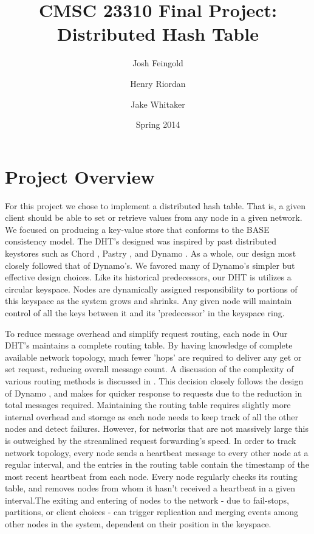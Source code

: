 \documentclass[11pt]{article}
\title{CMSC 23310 Final Project:\\
Distributed Hash Table}
\author{Josh Feingold \and Henry Riordan \and Jake Whitaker}
\date{Spring 2014}
\begin{document}
\maketitle

\section{Project Overview}\label{sec:overview}

For this project we chose to implement a distributed hash table. That is, a given client should be able to set or retrieve values from any node in a given network. We focused on producing a key-value store that conforms to the BASE consistency model.\cite{Fox_1997_BASE} The DHT's designed was inspired by past distributed keystores such as Chord \cite{Stoica_2003_Chord}, Pastry \cite{Rowstron_2001_Pastry}, and Dynamo \cite{DeCandia_2007_Dynamo}. As a whole, our design most closely followed that of Dynamo's. We favored many of Dynamo's simpler but effective design choices. Like its historical predecessors, our DHT is utilizes a circular keyspace. Nodes are dynamically assigned responsibility to portions of this keyspace as the system grows and shrinks. Any given node will maintain control of all the keys between it and its 'predecessor' in the keyspace ring. 

To reduce message overhead and simplify request routing, each node in Our DHT's maintains a complete routing table. By having knowledge of complete available network topology, much fewer 'hops' are required to deliver any get or set request, reducing overall message count. A discussion of the complexity of various routing methods is discussed in \cite{Stoica_2003_Chord, Rowstron_2001_Pastry}. This decision closely follows the design of Dynamo \cite{DeCandia_2007_Dynamo}, and makes for quicker response to requests due to the reduction in total messages required. Maintaining the routing table requires slightly more internal overhead and storage as each node needs to keep track of all the other nodes and detect failures. However, for networks that are not massively large this is outweighed by the streamlined request forwarding's speed. In order to track network topology, every node sends a heartbeat message to every other node at a regular interval, and the entries in the routing table contain the timestamp of the most recent heartbeat from each node. Every node regularly checks its routing table, and removes nodes from whom it hasn't received a heartbeat in a given interval.The exiting and entering of nodes to the network - due to fail-stops, partitions, or client choices - can trigger replication and merging events among other nodes in the system, dependent on their position in the keyspace.
\end{document}
